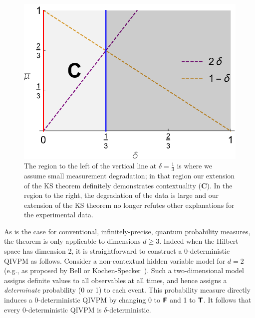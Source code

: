 \documentclass[english,reprint, aps, prl,superscriptaddress, showpacs,
showkeys, longbibliography, amsmath, amssymb, floatfix]{revtex4-1}
\theoremstyle{plain}
\theoremstyle{definition}
\newcommand{\imposs}{\textbf{\textsf{F}}}
\newcommand{\necess}{\textbf{\textsf{T}}}
\begin{document}
\begin{figure}
\begin{center}
\includegraphics[scale=0.5]{prop_letter_ajhs_referee_response_nb} 
\par\end{center}
\caption{The region to the left of the vertical line at
$\delta=\frac{1}{3}$ is where we assume small measurement degradation;
in that region our extension of the KS theorem definitely demonstrates
contextuality ({\bf{\sf C}}). In the region to the right, the degradation of the data
is large and our extension of the KS theorem no longer refutes other
explanations for the experimental data.}
\label{fignoname}
\end{figure}

As is the case for conventional, infinitely-precise, quantum
probability measures, the theorem is only applicable to dimensions
$d \geq 3$. Indeed when the Hilbert space has dimension 2, it is
straightforward to construct a 0-deterministic QIVPM as
follows. Consider a non-contextual hidden variable model for $d=2$
(e.g., as proposed by Bell or
Kochen-Specker~\cite{BELL_1966,kochenspecker1967}). Such a
two-dimensional model assigns definite values to all observables at
all times, and hence assigns a \emph{determinate} probability (0 or 1)
to each event. This probability measure directly induces a
0-deterministic QIVPM by changing 0 to $\imposs$ and 1 to
$\necess$.  It follows that every 0-deterministic QIVPM is
$\delta$-deterministic.
\end{document}
